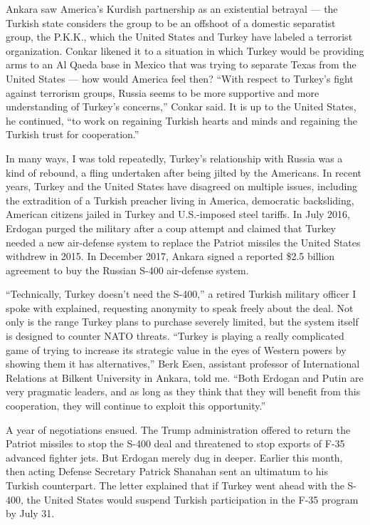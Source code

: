 Ankara saw America's Kurdish partnership as an existential betrayal ---
the Turkish state considers the group to be an offshoot of a domestic
separatist group, the P.K.K., which the United States and Turkey have
labeled a terrorist organization. Conkar likened it to a situation in
which Turkey would be providing arms to an Al Qaeda base in Mexico that
was trying to separate Texas from the United States --- how would
America feel then? ``With respect to Turkey's fight against terrorism
groups, Russia seems to be more supportive and more understanding of
Turkey's concerns,'' Conkar said. It is up to the United States, he
continued, ``to work on regaining Turkish hearts and minds and regaining
the Turkish trust for cooperation.''

In many ways, I was told repeatedly, Turkey's relationship with Russia
was a kind of rebound, a fling undertaken after being jilted by the
Americans. In recent years, Turkey and the United States have disagreed
on multiple issues, including the extradition of a Turkish preacher
living in America, democratic backsliding, American citizens jailed in
Turkey and U.S.-imposed steel tariffs. In July 2016, Erdogan purged the
military after a coup attempt and claimed that Turkey needed a new
air-defense system to replace the Patriot missiles the United States
withdrew in 2015. In December 2017, Ankara signed a reported \$2.5
billion agreement to buy the Russian S-400 air-defense system.

``Technically, Turkey doesn't need the S-400,'' a retired Turkish
military officer I spoke with explained, requesting anonymity to speak
freely about the deal. Not only is the range Turkey plans to purchase
severely limited, but the system itself is designed to counter NATO
threats. ``Turkey is playing a really complicated game of trying to
increase its strategic value in the eyes of Western powers by showing
them it has alternatives,'' Berk Esen, assistant professor of
International Relations at Bilkent University in Ankara, told me. ``Both
Erdogan and Putin are very pragmatic leaders, and as long as they think
that they will benefit from this cooperation, they will continue to
exploit this opportunity.''

A year of negotiations ensued. The Trump administration offered to
return the Patriot missiles to stop the S-400 deal and threatened to
stop exports of F-35 advanced fighter jets. But Erdogan merely dug in
deeper. Earlier this month, then acting Defense Secretary Patrick
Shanahan sent an ultimatum to his Turkish counterpart. The letter
explained that if Turkey went ahead with the S-400, the United States
would suspend Turkish participation in the F-35 program by July 31.

